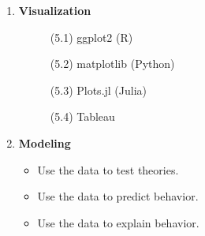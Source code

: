 \documentclass[11pt,a4paper]{article}
\begin{document}
\begin{enumerate}
    \item \textbf{Visualization}
		  \begin{description}
	            \item[]	(5.1) ggplot2 (R)
	            \item[] (5.2) matplotlib (Python)
	            \item[]	(5.3) Plots.jl (Julia)
	            \item[] (5.4) Tableau
          \end{description}
          
    \item \textbf{Modeling}
          \begin{itemize} 
	         \item Use the data to test theories.
        	 \item Use the data to predict behavior. 
        	 \item Use the data to explain behavior.
          \end{itemize}
          
\end{enumerate}
\end{document}
